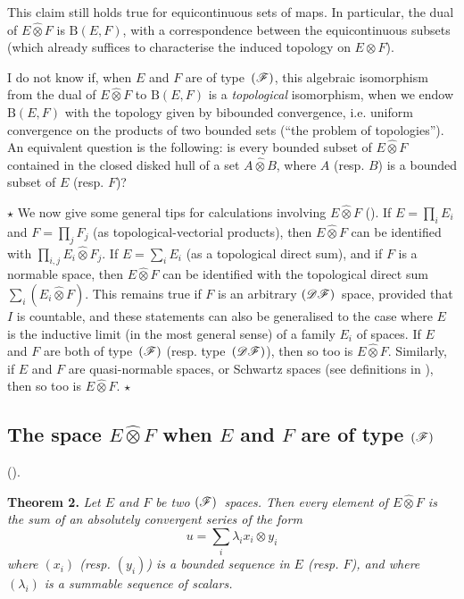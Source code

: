 \documentclass{article}
\theoremstyle{plain}
\newenvironment{itenv}[1]
  {\phantomsection\par\medskip\noindent\textbf{#1.}\itshape}
  {\medskip}
\newcommand{\aster}[1]{$\star${#1}$\star$}
\newcommand{\BB}{\mathrm{B}}
\newcommand{\DF}{\mbox{\normalfont($\mathscr{DF}$)}}
\newcommand{\FF}{\mbox{\normalfont($\mathscr{F}$)}}
\newcommand{\hotimes}{\widehat{\otimes}}
\newcommand{\oldpage}[1]{\marginpar{\footnotesize$\Big\vert$ \textit{p.~#1}}}
\begin{document}
This claim still holds true for equicontinuous sets of maps.
In particular, the dual of $E\hotimes F$ is $\BB(E,F)$, with a correspondence between the equicontinuous subsets (which already suffices to characterise the induced topology on $E\otimes F$).

I do not know if, when $E$ and $F$ are of type~$\FF$, this algebraic isomorphism from the dual of $E\hotimes F$ to $\BB(E,F)$ is a \emph{topological} isomorphism, when we endow $\BB(E,F)$ with the topology given by bibounded convergence, i.e. uniform convergence on the products of two bounded sets (``the problem of topologies'').
An equivalent question is the following:
is every bounded subset of $E\hotimes F$ contained in the closed disked hull of a set $A\hotimes B$, where $A$ (resp. $B$) is a bounded subset of $E$ (resp. $F$)?

\aster{%
  We now give some general tips for calculations involving $E\hotimes F$ (\cite[chap.~I, \S1, n\textsuperscript{o}~3]{PTT}).
  If $E=\prod_i E_i$ and $F=\prod_j F_j$ (as topological-vectorial products), then $E\hotimes F$ can be identified with $\prod_{i,j}E_i\hotimes F_j$.
  If $E=\sum_i E_i$ (as a topological direct sum), and if $F$ is a normable space, then $E\hotimes F$ can be identified with the topological direct sum $\sum_i(E_i\hotimes F)$.
  This remains true if $F$ is an arbitrary $\DF$~space, provided that $I$ is countable, and these statements can also be generalised to the case where $E$ is the inductive limit (in the most general sense) of a family $E_i$ of spaces.
  If $E$ and $F$ are both of type~$\FF$ (resp. type~$\DF$), then so too is $E\hotimes F$.
  Similarly, if $E$ and $F$ are quasi-normable spaces, or Schwartz spaces (see definitions in \cite[\S3]{6}), then so too is $E\hotimes F$.
}

\oldpage{78}
\subsection{The space \texorpdfstring{$E\hotimes F$}{EF} when \texorpdfstring{$E$}{E} and \texorpdfstring{$F$}{F} are of type \texorpdfstring{$\FF$}{(F)}}
\label{1.2}

(\cite[chap.~1, \S2, n\textsuperscript{o}~1]{PTT}).
\medskip

\begin{itenv}{Theorem 2}
\label{1.theorem2}
  Let $E$ and $F$ be two $\FF$~spaces.
  Then every element of $E\hotimes F$ is the sum of an absolutely convergent series of the form
  \[
    u = \sum_i \lambda_i x_i \otimes y_i
  \]
  where $(x_i)$ (resp. $(y_i)$) is a bounded sequence in $E$ (resp. $F$), and where $(\lambda_i)$ is a summable sequence of scalars.
\end{itenv}
\end{document}
